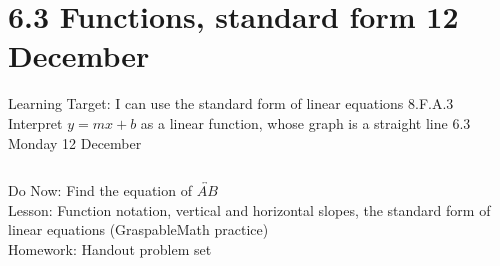 \section{6.3 Functions, standard form \hfill 12 December \,}
\begin{frame}{Learning Target: I can use the standard form of linear equations}
  {8.F.A.3 Interpret $y=mx+b$ as a linear function, whose graph is a straight line \hfill \alert{6.3 Monday 12 December}}
  \begin{columns}
      Do Now: Find the equation of $\overleftrightarrow{AB}$ \\[1cm]
      Lesson: Function notation, vertical and horizontal slopes, the standard form of linear equations (GraspableMath practice) \\
      Homework: Handout problem set
    \begin{flushright}
    \end{flushright}
  \end{columns}
\end{frame}

